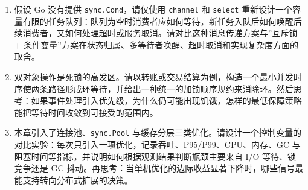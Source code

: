 \begin{tcolorbox}[breakable]
\begin{enumerate}
    \item 假设 Go 没有提供 \texttt{sync.Cond}，请仅使用 \texttt{channel} 和 \texttt{select} 重新设计一个容量有限的任务队列：队列为空时消费者应如何等待，新任务入队后如何唤醒后续消费者，又如何处理超时或服务取消。请对比这种消息传递方案与”互斥锁 + 条件变量”方案在状态归属、多等待者唤醒、超时取消和实现复杂度方面的取舍。

    \item 双对象操作是死锁的高发区。请以转账或交易结算为例，构造一个最小并发时序使两条路径形成环等待，并给出一种统一的加锁顺序规约来消除环。然后思考：如果事件处理引入优先级，为什么仍可能出现饥饿，怎样的最低保障策略能把等待时间收敛到可接受的范围内。

    \item 本章引入了连接池、\texttt{sync.Pool} 与缓存分层三类优化。请设计一个控制变量的对比实验：每次只引入一项优化，记录吞吐、P95/P99、CPU、内存、GC 与阻塞时间等指标，并说明如何根据观测结果判断瓶颈主要来自 I/O 等待、锁竞争还是 GC 抖动。再思考：当单机优化的边际收益显著下降时，哪些信号最能支持转向分布式扩展的决策。
\end{enumerate}
\end{tcolorbox}

\newpage
